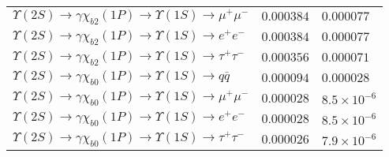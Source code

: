 \documentclass[12pt]{article}
\begin{document}
\begin{tabular}{p{4.7in} l l}
$   \Upsilon(2S) \to \gamma \chi_{b2}(1P) \to \Upsilon(1S) \to \mu^+ \mu^-     $ & $   0.000384    $ & $   0.000077     $ \\ 
$   \Upsilon(2S) \to \gamma \chi_{b2}(1P) \to \Upsilon(1S) \to e^+ e^-         $ & $   0.000384    $ & $   0.000077     $ \\ 
$   \Upsilon(2S) \to \gamma \chi_{b2}(1P) \to \Upsilon(1S) \to \tau^+ \tau^-   $ & $   0.000356     $ & $   0.000071     $ \\ 
$   \Upsilon(2S) \to \gamma \chi_{b0}(1P) \to \Upsilon(1S) \to q\bar{q}        $ & $   0.000094    $ & $   0.000028   $ \\ 
$   \Upsilon(2S) \to \gamma \chi_{b0}(1P) \to \Upsilon(1S) \to \mu^+ \mu^-     $ & $   0.000028   $ & $   8.5\times 10^{-6}      $ \\ 
$   \Upsilon(2S) \to \gamma \chi_{b0}(1P) \to \Upsilon(1S) \to e^+ e^-         $ & $   0.000028   $ & $   8.5\times 10^{-6}      $ \\ 
$   \Upsilon(2S) \to \gamma \chi_{b0}(1P) \to \Upsilon(1S) \to \tau^+ \tau^-   $ & $   0.000026   $ & $   7.9\times 10^{-6}       $ \\
\end{tabular}
\newpage
\hspace{-1.3in} \vspace{-1.4in}
\end{document}

